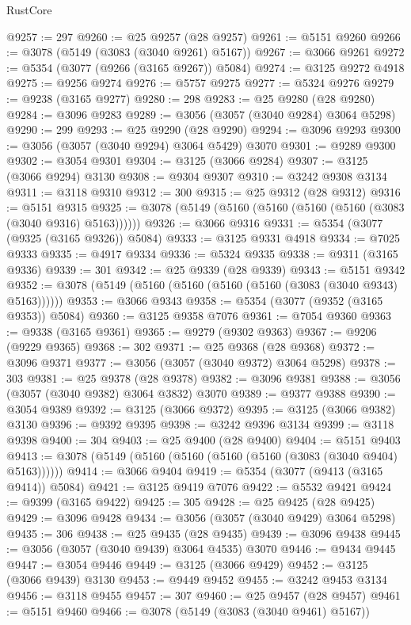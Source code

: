 \begin{lexlean}{RustCore}
\begin{coremodule}
@9257 := 297
@9260 := @25 @9257 (@28 @9257)
@9261 := @5151 @9260
@9266 := @3078 (@5149 (@3083 (@3040 @9261) @5167))
@9267 := @3066 @9261
@9272 := @5354 (@3077 (@9266 (@3165 @9267)) @5084)
@9274 := @3125 @9272 @4918
@9275 := @9256 @9274
@9276 := @5757 @9275
@9277 := @5324 @9276
@9279 := @9238 (@3165 @9277)
@9280 := 298
@9283 := @25 @9280 (@28 @9280)
@9284 := @3096 @9283
@9289 := @3056 (@3057 (@3040 @9284) @3064 @5298)
@9290 := 299
@9293 := @25 @9290 (@28 @9290)
@9294 := @3096 @9293
@9300 := @3056 (@3057 (@3040 @9294) @3064 @5429) @3070
@9301 := @9289 @9300
@9302 := @3054 @9301
@9304 := @3125 (@3066 @9284)
@9307 := @3125 (@3066 @9294) @3130
@9308 := @9304 @9307
@9310 := @3242 @9308 @3134
@9311 := @3118 @9310
@9312 := 300
@9315 := @25 @9312 (@28 @9312)
@9316 := @5151 @9315
@9325 := @3078 (@5149 (@5160 (@5160 (@5160 (@5160 (@3083 (@3040 @9316) @5163))))))
@9326 := @3066 @9316
@9331 := @5354 (@3077 (@9325 (@3165 @9326)) @5084)
@9333 := @3125 @9331 @4918
@9334 := @7025 @9333
@9335 := @4917 @9334
@9336 := @5324 @9335
@9338 := @9311 (@3165 @9336)
@9339 := 301
@9342 := @25 @9339 (@28 @9339)
@9343 := @5151 @9342
@9352 := @3078 (@5149 (@5160 (@5160 (@5160 (@5160 (@3083 (@3040 @9343) @5163))))))
@9353 := @3066 @9343
@9358 := @5354 (@3077 (@9352 (@3165 @9353)) @5084)
@9360 := @3125 @9358 @7076
@9361 := @7054 @9360
@9363 := @9338 (@3165 @9361)
@9365 := @9279 (@9302 @9363)
@9367 := @9206 (@9229 @9365)
@9368 := 302
@9371 := @25 @9368 (@28 @9368)
@9372 := @3096 @9371
@9377 := @3056 (@3057 (@3040 @9372) @3064 @5298)
@9378 := 303
@9381 := @25 @9378 (@28 @9378)
@9382 := @3096 @9381
@9388 := @3056 (@3057 (@3040 @9382) @3064 @3832) @3070
@9389 := @9377 @9388
@9390 := @3054 @9389
@9392 := @3125 (@3066 @9372)
@9395 := @3125 (@3066 @9382) @3130
@9396 := @9392 @9395
@9398 := @3242 @9396 @3134
@9399 := @3118 @9398
@9400 := 304
@9403 := @25 @9400 (@28 @9400)
@9404 := @5151 @9403
@9413 := @3078 (@5149 (@5160 (@5160 (@5160 (@5160 (@3083 (@3040 @9404) @5163))))))
@9414 := @3066 @9404
@9419 := @5354 (@3077 (@9413 (@3165 @9414)) @5084)
@9421 := @3125 @9419 @7076
@9422 := @5532 @9421
@9424 := @9399 (@3165 @9422)
@9425 := 305
@9428 := @25 @9425 (@28 @9425)
@9429 := @3096 @9428
@9434 := @3056 (@3057 (@3040 @9429) @3064 @5298)
@9435 := 306
@9438 := @25 @9435 (@28 @9435)
@9439 := @3096 @9438
@9445 := @3056 (@3057 (@3040 @9439) @3064 @4535) @3070
@9446 := @9434 @9445
@9447 := @3054 @9446
@9449 := @3125 (@3066 @9429)
@9452 := @3125 (@3066 @9439) @3130
@9453 := @9449 @9452
@9455 := @3242 @9453 @3134
@9456 := @3118 @9455
@9457 := 307
@9460 := @25 @9457 (@28 @9457)
@9461 := @5151 @9460
@9466 := @3078 (@5149 (@3083 (@3040 @9461) @5167))

\end{coremodule}
\end{lexlean}
